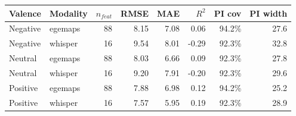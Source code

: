 \begin{tabular}{llrrrrrr}
\toprule
Valence & Modality & $n_{feat}$ & RMSE & MAE & $R^2$ & PI cov & PI width \\
\midrule
Negative & egemaps & 88 & 8.15 & 7.08 & 0.06 & 94.2\% & 27.6 \\
Negative & whisper & 16 & 9.54 & 8.01 & -0.29 & 92.3\% & 32.8 \\
Neutral & egemaps & 88 & 8.03 & 6.66 & 0.09 & 92.3\% & 27.8 \\
Neutral & whisper & 16 & 9.20 & 7.91 & -0.20 & 92.3\% & 29.6 \\
Positive & egemaps & 88 & 7.88 & 6.98 & 0.12 & 94.2\% & 25.2 \\
Positive & whisper & 16 & 7.57 & 5.95 & 0.19 & 92.3\% & 28.9 \\
\bottomrule
\end{tabular}
